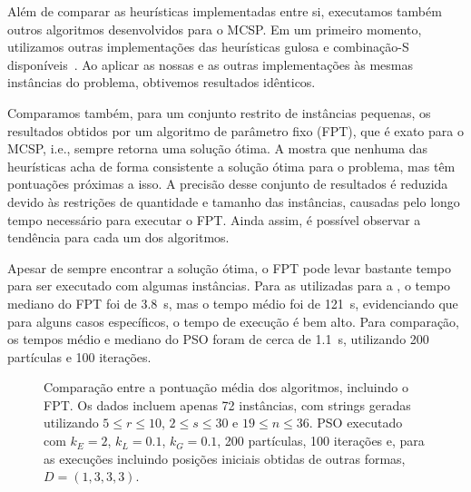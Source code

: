         Além de comparar as heurísticas implementadas entre si, executamos também outros algoritmos desenvolvidos para o MCSP. Em um primeiro momento, utilizamos outras implementações das heurísticas gulosa e combinação-S disponíveis~\cite{siqueira_signed_2023}. Ao aplicar as nossas e as outras implementações às mesmas instâncias do problema, obtivemos resultados idênticos.

        Comparamos também, para um conjunto restrito de instâncias pequenas, os resultados obtidos por um algoritmo de parâmetro fixo (FPT), que é exato para o MCSP, i.e., sempre retorna uma solução ótima. A  mostra que nenhuma das heurísticas acha de forma consistente a solução ótima para o problema, mas têm pontuações próximas a isso. A precisão desse conjunto de resultados é reduzida devido às restrições de quantidade e tamanho das instâncias, causadas pelo longo tempo necessário para executar o FPT. Ainda assim, é possível observar a tendência para cada um dos algoritmos.

        Apesar de sempre encontrar a solução ótima, o FPT pode levar bastante tempo para ser executado com algumas instâncias. Para as utilizadas para a , o tempo mediano do FPT foi de \SI{3.8}{\second}, mas o tempo médio foi de \SI{121}{\second}, evidenciando que para alguns casos específicos, o tempo de execução é bem alto. Para comparação, os tempos médio e mediano do PSO foram de cerca de \SI{1.1}{\second}, utilizando 200 partículas e 100 iterações.

        \begin{figure}[htb]
            \centering

            \caption{Comparação entre a pontuação média dos algoritmos, incluindo o FPT. Os dados incluem apenas 72 instâncias, com strings geradas utilizando $5 \leq r \leq 10$, $2 \leq s \leq 30$ e $19 \leq n \leq 36$. PSO executado com $k_E = 2$, $k_L = 0.1$, $k_G = 0.1$, 200 partículas, 100 iterações e, para as execuções incluindo posições iniciais obtidas de outras formas, $D = (1, 3, 3, 3)$.}
            \label{fig:fpt}
        \end{figure}
